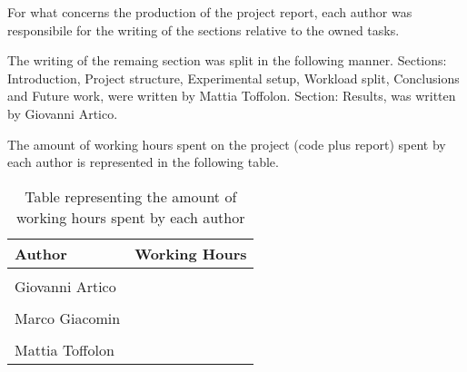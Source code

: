 \begin{flushleft}
For what concerns the production of the project report, each author was responsibile for the writing of the sections relative to the owned tasks. \\   
\end{flushleft}
The writing of the remaing section was split in the following manner.
Sections: Introduction, Project structure, Experimental setup, Workload split, Conclusions and Future work, were written by Mattia Toffolon. 
Section: Results, was written by Giovanni Artico. \\

\begin{flushleft}
The amount of working hours spent on the project (code plus report) spent by each author is represented in the following table.
\end{flushleft}
\begin{table}[h]
    \centering
    \begin{tabular}{|l|c|}
        \hline
        \textbf{Author} & \textbf{Working Hours} \\ \hline
        \\[-1em]
        Giovanni Artico & \\ \hline
        \\[-1em]
        Marco Giacomin & \\ \hline
        \\[-1em]
        Mattia Toffolon & \\ \hline
    \end{tabular}
    \caption{Table representing the amount of working hours spent by each author}
\end{table}